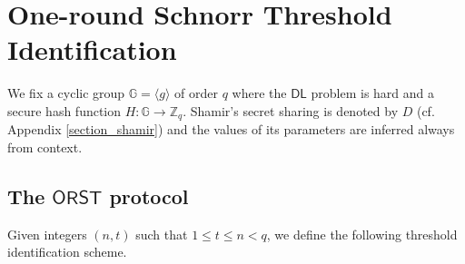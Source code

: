 \documentclass{iacrtrans}
\begin{document}
\section{One-round Schnorr Threshold Identification}\label{section_orst}

\noindent
We fix a cyclic group $\mathbb{G} = \langle g \rangle$ of order $q$
where the $\mathsf{DL}$ problem is hard and
a secure hash function $H: \mathbb{G} \rightarrow \mathbb{Z}_q$.
Shamir's secret sharing is denoted by $D$
(cf. Appendix \ref{section_shamir}) and the values
of its parameters are inferred always from context.

\subsection{The $\mathsf{ORST}$ protocol}

Given integers $(n, t)$ such that $1 \le t \le n < q$,
we define the following threshold identification scheme.
\end{document}
